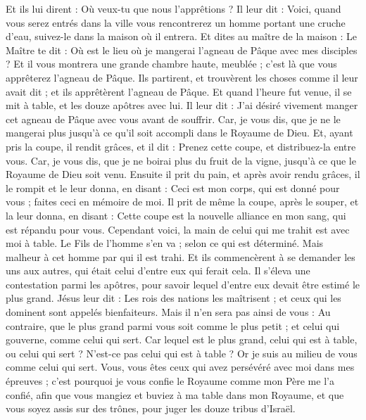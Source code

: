 \begin{multicols}{2}
{Et ils lui dirent : Où veux-tu que nous l'apprêtions ?
Il leur dit : Voici, quand vous serez entrés dans la ville vous rencontrerez un homme portant une cruche d'eau, suivez-le dans la maison où il entrera.
Et dites au maître de la maison : Le Maître te dit : Où est le lieu où je mangerai l'agneau de Pâque avec mes disciples ?
Et il vous montrera une grande chambre haute, meublée ; c’est là que vous apprêterez l'agneau de Pâque.
Ils partirent, et trouvèrent les choses comme il leur avait dit ; et ils apprêtèrent l'agneau de Pâque.
Et quand l'heure fut venue, il se mit à table, et les douze apôtres avec lui.
Il leur dit : J'ai désiré vivement manger cet agneau de Pâque avec vous avant de souffrir.
Car, je vous dis, que je ne le mangerai plus jusqu'à ce qu'il soit accompli dans le Royaume de Dieu.
Et, ayant pris la coupe, il rendit grâces, et il dit : Prenez cette coupe, et distribuez-la entre vous.
Car, je vous dis, que je ne boirai plus du fruit de la vigne, jusqu'à ce que le Royaume de Dieu soit venu.
Ensuite il prit du pain, et après avoir rendu grâces, il le rompit et le leur donna, en disant : Ceci est mon corps, qui est donné pour vous ; faites ceci en mémoire de moi.
Il prit de même la coupe, après le souper, et la leur donna, en disant : Cette coupe est la nouvelle alliance en mon sang, qui est répandu pour vous.
Cependant voici, la main de celui qui me trahit est avec moi à table.
Le Fils de l'homme s'en va ; selon ce qui est déterminé. Mais malheur à cet homme par qui il est trahi.
Et ils commencèrent à se demander les uns aux autres, qui était celui d’entre eux qui ferait cela.
Il s’éleva une contestation parmi les apôtres, pour savoir lequel d'entre eux devait être estimé le plus grand.
Jésus leur dit : Les rois des nations les maîtrisent ; et ceux qui les dominent sont appelés bienfaiteurs.
Mais il n'en sera pas ainsi de vous : Au contraire, que le plus grand parmi vous soit comme le plus petit ; et celui qui gouverne, comme celui qui sert.
Car lequel est le plus grand, celui qui est à table, ou celui qui sert ? N'est-ce pas celui qui est à table ? Or je suis au milieu de vous comme celui qui sert.
Vous, vous êtes ceux qui avez persévéré avec moi dans mes épreuves ;
c’est pourquoi je vous confie le Royaume comme mon Père me l'a confié,
afin que vous mangiez et buviez à ma table dans mon Royaume, et que vous soyez assis sur des trônes, pour juger les douze tribus d'Israël.
}
\end{multicols}
